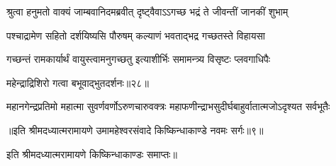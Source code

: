 \twolineshloka
{श्रुत्वा हनुमतो वाक्यं जाम्बवानिदमब्रवीत्}
{दृष्ट्वैवाऽऽगच्छ भद्रं ते जीवन्तीं जानकीं शुभाम्} %

\twolineshloka
{पश्चाद्रामेण सहितो दर्शयिष्यसि पौरुषम्}
{कल्याणं भवताद्भद्र गच्छतस्ते विहायसा} %

\twolineshloka
{गच्छन्तं रामकार्यार्थं वायुस्त्वामनुगच्छतु}
{इत्याशीर्भिः समामन्त्र्य विसृष्टः प्लवगाधिपैः} %

{महेन्द्राद्रिशिरो गत्वा बभूवाद्भुतदर्शनः॥२८॥} %


\twolineshloka
{महानगेन्द्रप्रतिमो महात्मा सुवर्णवर्णोऽरुणचारुवक्त्रः}
{महाफणीन्द्राभसुदीर्घबाहुर्वातात्मजोऽदृश्यत सर्वभूतैः} %

{॥इति श्रीमदध्यात्मरामायणे उमामहेश्वरसंवादे किष्किन्धाकाण्डे
नवमः सर्गः॥९॥}

इति श्रीमदध्यात्मरामायणे किष्किन्धाकाण्डः समाप्तः॥